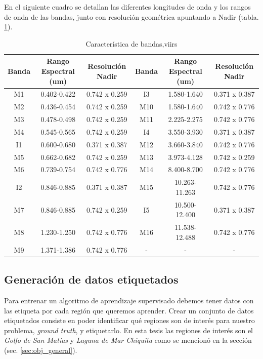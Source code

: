 En el siguiente cuadro se detallan las diferentes longitudes de onda y los rangos de onda de las bandas, junto con resolución geométrica apuntando a Nadir (tabla. \ref{tab:viirs}).
\begin{table}[H]
\begin{center}
\begin{tabular}{|c|c|c||c|c|c|}
\hline \textbf{Banda} & Rango Espectral (um) & Resolución Nadir & \textbf{Banda} & Rango Espectral (um) & Resolución Nadir \\\hline 
 		M1  & 0.402-0.422   & 0.742 x 0.259 & I3  & 1.580-1.640   & 0.371 x 0.387 \\ \hline 
		M2  & 0.436-0.454   & 0.742 x 0.259 & M10 & 1.580-1.640   & 0.742 x 0.776 \\ \hline 
		M3  & 0.478-0.498   & 0.742 x 0.259 & M11 & 2.225-2.275   & 0.742 x 0.776 \\ \hline 
		M4  & 0.545-0.565   & 0.742 x 0.259 & I4  & 3.550-3.930   & 0.371 x 0.387 \\ \hline 
		I1  & 0.600-0.680   & 0.371 x 0.387 & M12 & 3.660-3.840   & 0.742 x 0.776 \\ \hline 
		M5  & 0.662-0.682   & 0.742 x 0.259 & M13 & 3.973-4.128   & 0.742 x 0.259 \\ \hline 
		M6  & 0.739-0.754   & 0.742 x 0.776 & M14 & 8.400-8.700   & 0.742 x 0.776 \\ \hline 
		I2  & 0.846-0.885   & 0.371 x 0.387 & M15 & 10.263-11.263 & 0.742 x 0.776 \\ \hline 
		M7  & 0.846-0.885   & 0.742 x 0.259 & I5  & 10.500-12.400 & 0.371 x 0.387 \\ \hline 
		M8  & 1.230-1.250   & 0.742 x 0.776 & M16 & 11.538-12.488 & 0.742 x 0.776 \\ \hline 
		M9  & 1.371-1.386   & 0.742 x 0.776 & - &-&- \\ \hline 
\end{tabular}
\end{center}\caption{Característica de bandas,\ac{viirs} \label{tab:viirs}}
\end{table}

\subsection{Generación de datos etiquetados}\label{sub:generacion_datos_etiquetado}

Para entrenar un algoritmo de aprendizaje supervisado debemos tener datos con las etiqueta por cada región que queremos aprender. Crear un conjunto de datos etiquetados consiste en poder identificar qué regiones son de interés para nuestro problema, \textit{ground truth}, y etiquetarlo. En esta tesis las regiones de interés son el \textit{Golfo de San Matías} y  \textit{Laguna de Mar Chiquita} como se mencionó en la sección (sec.  \ref{sec:obj_general}).

